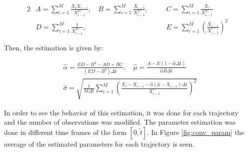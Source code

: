 \documentclass[11pt]{article}
\theoremstyle{definition}
\theoremstyle{remark}
\theoremstyle{remark}
\begin{document}
\begin{alignat*}{2}
  &A = \sum_{i=1}^M \frac{X_iX_{i-1}}{X_{i-1}^{2\gamma}}, \quad
  B= \sum_{i=1}^M \frac{X_{i-1}}{X_{i-1}^{2\gamma}}, \quad
  &&C = \sum_{i=1}^M \frac{X_i}{X_{i-1}^{2\gamma}} \\
  &D = \sum_{i=1}^M \frac{1}{X_{i-1}^{2\gamma}}, \quad
  &&E = \sum_{i=1}^M \left(\frac{X_{i-1}}{X_{i-1}^\gamma}\right)^2
\end{alignat*}

Then, the estimation is given by:

\begin{align*}
  &\hat{\alpha} = \frac{ED - B^2 - AD + BC}{(ED - B^2)\Delta t}, \quad
    \hat{\mu} = \frac{A - E(1 - \hat{\alpha} \Delta t)}{\hat{\alpha} B \Delta t} \\
  &\hat{\sigma} = \sqrt{\frac{1}{M \Delta t} \sum_{i=1}^M
    \left(\frac{X_i - X_{i-1} - \hat{\alpha}(\hat{\mu} - X_{i-1})\Delta t}{
    X_{i-1}^\gamma}\right)^2}
\end{align*}

In order to see the behavior of this estimation, it was
done for each trajectory and the number of observations was
modified. The parameter estimation was done in different time frames
of the form $[0, \tilde{t}]$. In Figure \ref{fig:conv_param} the
average of the estimated parameters for each trajectory is seen.
\end{document}
